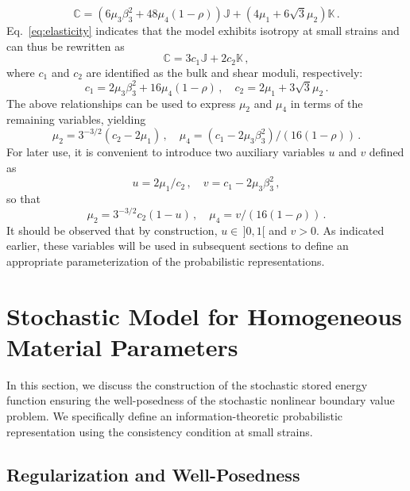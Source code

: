 \begin{equation}
    \mathbb{C} = (6 \mu_3 \beta_3^2+48 \mu_4(1 - \rho))\mathbb{J} + (4\mu_1+6\sqrt{3}\mu_2) \mathbb{K}\,. \label{eq:elasticity}
\end{equation}
Eq.~\eqref{eq:elasticity} indicates that the model exhibits isotropy at small strains and can thus be rewritten as
\begin{equation}
    \mathbb{C} = 3 c_1 \mathbb{J} + 2 c_2\mathbb{K}\,,
\end{equation}
where $c_1$ and $c_2$ are identified as the bulk and shear moduli, respectively:
\begin{equation}
    c_1 = 2 \mu_3 \beta_3^2+16\mu_4(1-\rho)\,,\quad c_2 = 2\mu_1+3\sqrt{3}\mu_2\,.
\end{equation}
The above relationships can be used to express $\mu_2$ and $\mu_4$ in terms of the remaining variables, yielding
\begin{equation}
     \mu_2 = 3^{-3/2}(c_2 - 2\mu_1)\,, \quad \mu_4 = (c_1 - 2 \mu_3 \beta_3^2)/\left(16(1-\rho)\right)\,.
\end{equation}
For later use, it is convenient to introduce two auxiliary variables $u$ and $v$ defined as
\begin{equation}
    u = 2\mu_1/c_2\,, \quad v = c_1 - 2 \mu_3 \beta_3^2\,,
\end{equation}
so that 
\begin{equation}
    \mu_2 = 3^{-3/2} c_2 (1 - u)\,, \quad \mu_4 = v/\left(16(1-\rho)\right)\,.
\end{equation}
It should be observed that by construction, $u \in \, ]0,1[$ and $v > 0$. As indicated earlier, these variables will be used in subsequent sections to define an appropriate parameterization of the probabilistic representations.

\section{Stochastic Model for Homogeneous Material Parameters}\label{sec:sto-homogeneous}


In this section, we discuss the construction of the stochastic stored energy function ensuring the well-posedness of the stochastic nonlinear boundary value problem. We specifically define an information-theoretic probabilistic representation using the consistency condition at small strains.

\subsection{Regularization and Well-Posedness}\label{subsec:regularization}

